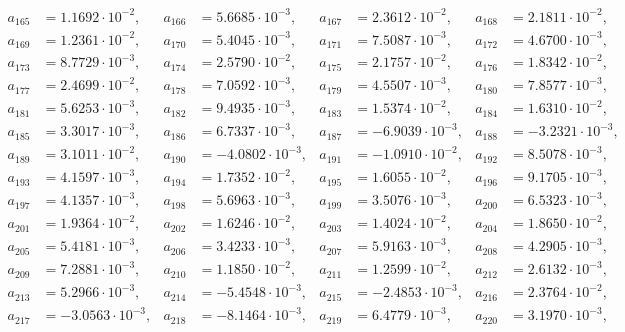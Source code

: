 \begin{align*}
a_{ 165 } &= 1.1692 \cdot 10^{ -2 }, & a_{ 166 } &= 5.6685 \cdot 10^{ -3 }, & a_{ 167 } &= 2.3612 \cdot 10^{ -2 }, & a_{ 168 } &= 2.1811 \cdot 10^{ -2 },\\ 
a_{ 169 } &= 1.2361 \cdot 10^{ -2 }, & a_{ 170 } &= 5.4045 \cdot 10^{ -3 }, & a_{ 171 } &= 7.5087 \cdot 10^{ -3 }, & a_{ 172 } &= 4.6700 \cdot 10^{ -3 },\\ 
a_{ 173 } &= 8.7729 \cdot 10^{ -3 }, & a_{ 174 } &= 2.5790 \cdot 10^{ -2 }, & a_{ 175 } &= 2.1757 \cdot 10^{ -2 }, & a_{ 176 } &= 1.8342 \cdot 10^{ -2 },\\ 
a_{ 177 } &= 2.4699 \cdot 10^{ -2 }, & a_{ 178 } &= 7.0592 \cdot 10^{ -3 }, & a_{ 179 } &= 4.5507 \cdot 10^{ -3 }, & a_{ 180 } &= 7.8577 \cdot 10^{ -3 },\\ 
a_{ 181 } &= 5.6253 \cdot 10^{ -3 }, & a_{ 182 } &= 9.4935 \cdot 10^{ -3 }, & a_{ 183 } &= 1.5374 \cdot 10^{ -2 }, & a_{ 184 } &= 1.6310 \cdot 10^{ -2 },\\ 
a_{ 185 } &= 3.3017 \cdot 10^{ -3 }, & a_{ 186 } &= 6.7337 \cdot 10^{ -3 }, & a_{ 187 } &= -6.9039 \cdot 10^{ -3 }, & a_{ 188 } &= -3.2321 \cdot 10^{ -3 },\\ 
a_{ 189 } &= 3.1011 \cdot 10^{ -2 }, & a_{ 190 } &= -4.0802 \cdot 10^{ -3 }, & a_{ 191 } &= -1.0910 \cdot 10^{ -2 }, & a_{ 192 } &= 8.5078 \cdot 10^{ -3 },\\ 
a_{ 193 } &= 4.1597 \cdot 10^{ -3 }, & a_{ 194 } &= 1.7352 \cdot 10^{ -2 }, & a_{ 195 } &= 1.6055 \cdot 10^{ -2 }, & a_{ 196 } &= 9.1705 \cdot 10^{ -3 },\\ 
a_{ 197 } &= 4.1357 \cdot 10^{ -3 }, & a_{ 198 } &= 5.6963 \cdot 10^{ -3 }, & a_{ 199 } &= 3.5076 \cdot 10^{ -3 }, & a_{ 200 } &= 6.5323 \cdot 10^{ -3 },\\ 
a_{ 201 } &= 1.9364 \cdot 10^{ -2 }, & a_{ 202 } &= 1.6246 \cdot 10^{ -2 }, & a_{ 203 } &= 1.4024 \cdot 10^{ -2 }, & a_{ 204 } &= 1.8650 \cdot 10^{ -2 },\\ 
a_{ 205 } &= 5.4181 \cdot 10^{ -3 }, & a_{ 206 } &= 3.4233 \cdot 10^{ -3 }, & a_{ 207 } &= 5.9163 \cdot 10^{ -3 }, & a_{ 208 } &= 4.2905 \cdot 10^{ -3 },\\ 
a_{ 209 } &= 7.2881 \cdot 10^{ -3 }, & a_{ 210 } &= 1.1850 \cdot 10^{ -2 }, & a_{ 211 } &= 1.2599 \cdot 10^{ -2 }, & a_{ 212 } &= 2.6132 \cdot 10^{ -3 },\\ 
a_{ 213 } &= 5.2966 \cdot 10^{ -3 }, & a_{ 214 } &= -5.4548 \cdot 10^{ -3 }, & a_{ 215 } &= -2.4853 \cdot 10^{ -3 }, & a_{ 216 } &= 2.3764 \cdot 10^{ -2 },\\ 
a_{ 217 } &= -3.0563 \cdot 10^{ -3 }, & a_{ 218 } &= -8.1464 \cdot 10^{ -3 }, & a_{ 219 } &= 6.4779 \cdot 10^{ -3 }, & a_{ 220 } &= 3.1970 \cdot 10^{ -3 },\\ 

\end{align*}
